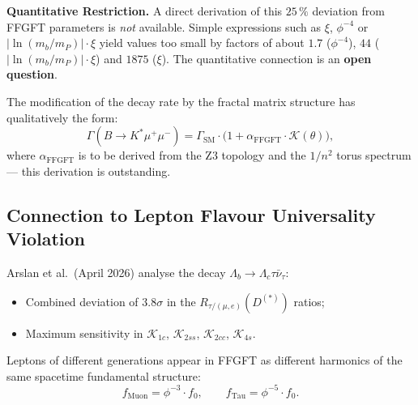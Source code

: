 \begin{warnbox}
\textbf{Quantitative Restriction.}
A direct derivation of this $25\,\%$ deviation from FFGFT parameters is
\emph{not} available. Simple expressions such as $\xi$, $\phi^{-4}$ or
$|\ln(m_b/m_P)|\cdot\xi$ yield values too small by factors of about $1.7$ ($\phi^{-4}$), $44$ ($|\ln(m_b/m_P)|\cdot\xi$) and $1875$ ($\xi$).
The quantitative connection is an \textbf{open question}.
\end{warnbox}

The modification of the decay rate by the fractal matrix structure has
qualitatively the form:
\begin{equation}
  \Gamma(B\to K^*\mu^+\mu^-)
  = \Gamma_{\text{SM}} \cdot
    \bigl(1 + \alpha_{\text{FFGFT}} \cdot \mathcal{K}(\theta)\bigr),
\end{equation}
where $\alpha_{\text{FFGFT}}$ is to be derived from the Z3 topology and
the $1/n^2$ torus spectrum — this derivation is outstanding.

\subsection{Connection to Lepton Flavour Universality Violation}

Arslan et al.\ (April 2026) \cite{Arslan2026} analyse the decay
$\Lambda_b \to \Lambda_c\tau\bar{\nu}_\tau$:
\begin{itemize}
  \item Combined deviation of $3.8\sigma$ in the
        $R_{\tau/(\mu,e)}(D^{(*)})$ ratios;
  \item Maximum sensitivity in
        $\mathcal{K}_{1c}$, $\mathcal{K}_{2ss}$, $\mathcal{K}_{2cc}$,
        $\mathcal{K}_{4s}$.
\end{itemize}

Leptons of different generations appear in FFGFT as different harmonics
of the same spacetime fundamental structure:
\begin{equation}
  f_{\text{Muon}} = \phi^{-3}\cdot f_0, \qquad
  f_{\text{Tau}}  = \phi^{-5}\cdot f_0.
\end{equation}

